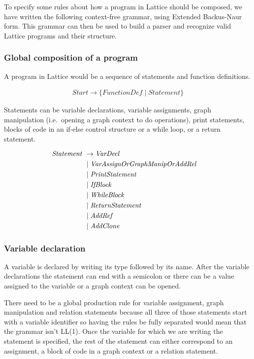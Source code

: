 To specify some rules about how a program in Lattice should be composed, we have written the following context-free grammar, using Extended Backus-Naur form.
This grammar can then be used to build a parser and recognize valid Lattice programs and their structure.

\subsubsection*{Global composition of a program}

A program in Lattice would be a sequence of statements and function definitions.

\begin{align*}
    \mathit{Start} \rightarrow \{ \mathit{FunctionDef} \mid \mathit{Statement} \}
\end{align*}

Statements can be variable declarations, variable assignments, graph manipulation (i.e.\ opening a graph context to do operations), print statements, blocks of code in an if-else control structure or a while loop, or a return statement.

\begin{align*}
    \omit $\mathit{Statement}$ \hfil& \rightarrow \mathit{VarDecl} \\
    & \mid \mathit{VarAssignOrGraphManipOrAddRel} \\
    & \mid \mathit{PrintStatement} \\
    & \mid \mathit{IfBlock} \\
    & \mid \mathit{WhileBlock} \\
    & \mid \mathit{ReturnStatement} \\
    & \mid \mathit{AddRef} \\
    & \mid \mathit{AddClone}
\end{align*}

\subsubsection*{Variable declaration}

A variable is declared by writing its type followed by its name.
After the variable declarations the statement can end with a semicolon or there can be a value assigned to the variable or a graph context can be opened.

There need to be a global production rule for variable assignment, graph manipulation and relation statements because all three of those statements start with a variable identifier so having the rules be fully separated would mean that the grammar isn't LL(1).
Once the variable for which we are writing the statement is specified, the rest of the statement can either correspond to an assignment, a block of code in a graph context or a relation statement.

